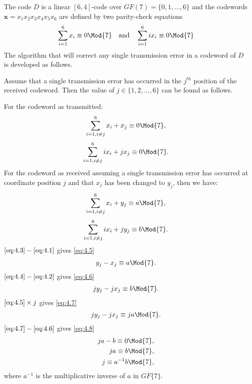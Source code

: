The code $D$ is a linear $[6,4]$-code over $GF(7)=\{0,1,\ldots,6\}$ and the codewords $\bm{x}=x_1x_2x_3x_4x_5x_6$ are defined by two parity-check equations
\[
	\sum_{i=1}^6 x_i\equiv 0 \Mod{7}\quad\textrm{and}\quad \sum_{i=1}^6 ix_i\equiv 0 \Mod{7}
\]
The algorithm that will correct any single transmission error in a codeword of $D$ is developed as follows.

Assume that a single transmission error has occurred in the $j^{th}$ position of the received codeword. Then the value of $j \in \{1,2,\ldots,6\}$ can be found as follows.

For the codeword as transmitted:
\begin{align}
\label{eq:4.1}
	\sum_{i=1,i\neq j}^{6} x_i + x_j \equiv 0 \Mod{7},
\end{align}
\begin{align}
\label{eq:4.2}
	\sum_{i=1,i\neq j}^{6} ix_i + jx_j \equiv 0 \Mod{7}.
\end{align}
For the codeword as received assuming a single transmission error has occurred at coordinate position $j$ and that $x_j$ has been changed to $y_j$, then we have:
\begin{align}
\label{eq:4.3}
	\sum_{i=1,i\neq j}^{6} x_i + y_j \equiv a \Mod{7},
\end{align}
\begin{align}
\label{eq:4.4}
	\sum_{i=1,i\neq j}^{6} ix_i + jy_j \equiv b \Mod{7}.
\end{align}
$\eqref{eq:4.3} - \eqref{eq:4.1}$ gives \eqref{eq:4.5}
\begin{align}
\label{eq:4.5}
	y_j - x_j \equiv a \Mod{7}.
\end{align}
$\eqref{eq:4.4} - \eqref{eq:4.2}$ gives \eqref{eq:4.6}
\begin{align}
\label{eq:4.6}
	jy_j - jx_j  \equiv b \Mod{7}.
\end{align}
$\eqref{eq:4.5}\times j$ gives \eqref{eq:4.7}
\begin{align}
\label{eq:4.7}
	jy_j - jx_j \equiv ja \Mod{7}.
\end{align}
$\eqref{eq:4.7} - \eqref{eq:4.6}$ gives \eqref{eq:4.8}
\begin{align}
\label{eq:4.8}
	ja - b \equiv 0 \Mod{7},\nonumber\\
	ja \equiv b \Mod{7},\nonumber\\
	j \equiv a^{-1}b \Mod{7},
\end{align}
where $a^{-1}$ is the multiplicative inverse of $a$ in $GF\{7\}$.
